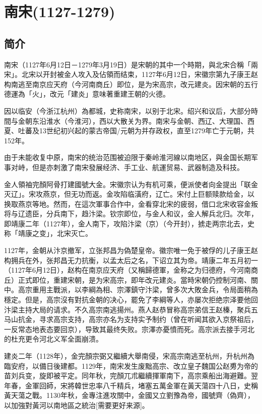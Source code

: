 
\chapter{南宋\tiny(1127-1279)}

\section{简介}

南宋（1127年6月12日－1279年3月19日）是宋朝的其中一个時期，與北宋合稱「兩宋」。北宋以开封被金人攻入及佔領而结束，1127年6月12日，宋徽宗第九子康王赵构南逃至南京应天府（今河南商丘）即位，是为宋高宗，改元建炎。因宋朝的五行德運為「火」，改元「建炎」意味著重建王朝的火德。

因以临安（今浙江杭州）為都城，史称南宋，以别于北宋。绍兴和议后，大部分時間与金朝东沿淮水（今淮河），西以大散关为界。南宋与金朝、西辽、大理国、西夏、吐蕃及13世纪初兴起的蒙古帝国/元朝为并存政权，直至1279年亡于元朝，共152年。

由于未能收复中原，南宋的统治范围被迫限于秦岭淮河線以南地区，與金国长期军事对峙，但是亦刺激了南宋發展经济、手工业、航運贸易、武器制造及科技。

金人領袖完顏阿骨打建國號大金。宋徽宗认为有机可乘，便派使者向金提出「联金灭辽」。宋攻燕京，但无功而返。金攻陷临潢府，辽亡。宋付上巨额赎款给金，以换取燕京等地。然而，在這次軍事合作中，金看穿北宋的疲弱，借口北宋收容金叛将与辽遗臣，分兵南下，趋汴梁。钦宗即位，与金人和议，金人解兵北归。次年，即靖康二年（1127年），金人南下，攻陷汴梁（京）（今开封），掳走两宗北去，史称「靖康之变」，北宋灭亡。

1127年，金朝从汴京撤军，立张邦昌为偽楚皇帝。徽宗唯一免于被俘的儿子康王赵构拥兵在外，张邦昌无力抗衡，以孟太后之名，下诏立其为帝。靖康二年五月初一（1127年6月12日），赵构在南京应天府（又稱歸德軍，金称之为归德府，今河南商丘）正式即位，重建宋朝，是为宋高宗，即年改元建炎。當時宋朝仍控制河南、關中。高宗重用主戰派，以李綱為相、宗澤鎮守汴梁，曾多次大敗金兵，令局面稍為穩定。但是，高宗沒有對抗金朝的决心，罷免了李綱等人，亦屡次拒绝宗泽要他回汴梁主持大局的请求。不久高宗南逃揚州。燕人赵恭冒称高宗弟信王赵榛，聚兵五马山抗金，寻求高宗支持，高宗亦名为支持实予制约（曾在听闻其欲入京祭祖后，一反常态地表态要回京），导致其最终失败。宗澤亦憂憤而死。高宗派去接手河北的杜充更令河北义军全面崩溃。

建炎二年（1128年），金完顏宗弼又繼續大舉南侵，宋高宗南逃至杭州，升杭州為臨安府，以備日後建都。1129年，南宋发生废黜高宗、改立皇子魏国公赵旉为帝的苗刘兵变，旋即被平定。同年秋，完顏兀朮繼續揮軍南下，高宗乘船出海避難。翌年春，金軍回師，宋將韓世忠率八千精兵，堵塞五萬金軍在黃天蕩四十八日，史稱黃天蕩之戰。1130年秋，金專注進攻關中，金國又立劉豫為帝，國號齊（偽齊），以加強對黃河以南地區之統治[需要更好来源]。

